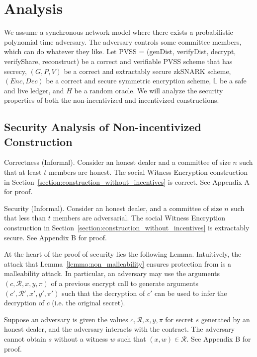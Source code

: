 \section{Analysis}
We assume a synchronous network model where there exists a probabilistic polynomial time adversary.
The adversary controls some committee members, which can do whatever they like.
Let \textsf{PVSS} = (\textsf{genDist}, \textsf{verifyDist}, \textsf{decrypt}, \textsf{verifyShare}, \textsf{reconstruct}) be a correct and verifiable PVSS scheme that has secrecy,
$(G, P, V)$ be a correct and extractably secure zkSNARK scheme, $(Enc, Dec)$ be a correct and secure symmetric encryption scheme,
$\mathbb{L}$ be a safe and live ledger, and $H$ be a random oracle.
We will analyze the security properties of both the non-incentivized and incentivized constructions.

\subsection{Security Analysis of Non-incentivized Construction}
\begin{theorem}{Correctness (Informal).}\label{thm:correctness_hm}
    Consider an honest dealer and a committee of size $n$ such that at least $t$ members are honest.
    The social Witness Encryption construction in Section~\ref{section:construction_without_incentives} is correct.
    See Appendix A for proof.
\end{theorem}

\begin{theorem}{Security (Informal).}\label{thm:security_hm}
    Consider an honest dealer, and a committee of size $n$ such that less than $t$ members are adversarial.
    The social Witness Encryption construction in Section~\ref{section:construction_without_incentives} is extractably secure.
    See Appendix B for proof.
\end{theorem}

At the heart of the proof of security lies the following Lemma.
Intuitively, the attack that Lemma~\ref{lemma:non_malleability} ensures protection from is a malleability attack.
In particular, an adversary may use the arguments $(c, \mathcal{R}, x, y, \pi)$ of a previous \textsf{encrypt} call to generate arguments $(c', \mathcal{R}', x', y', \pi')$ such that the decryption of $c'$ can be used to infer the decryption of $c$ (i.e. the original secret).

\begin{lemma}\label{lemma:non_malleability}
    Suppose an adversary is given the values $c, \mathcal{R}, x, y, \pi$ for secret $s$ generated by an honest dealer, and the adversary interacts with the contract.
    The adversary cannot obtain $s$ without a witness $w$ such that $(x, w) \in \mathcal{R}$. See Appendix B for proof.
\end{lemma}

